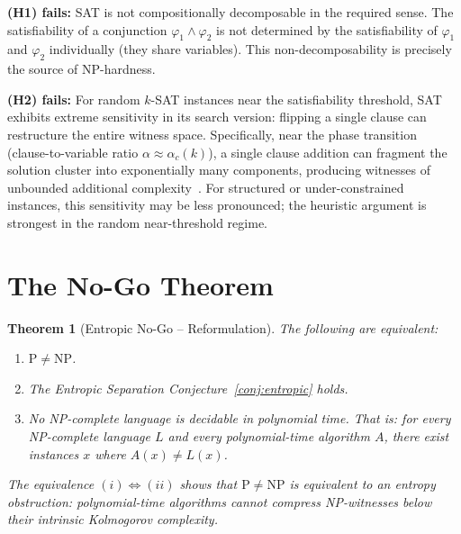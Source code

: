 \documentclass[aps,prd,twocolumn,superscriptaddress,nofootinbib]{revtex4-2}
\newtheorem{theorem}{Theorem}[section]
\theoremstyle{definition}
\theoremstyle{remark}
\newcommand{\NP}{\mathrm{NP}}
\newcommand{\PP}{\mathrm{P}}
\begin{document}
\textbf{(H1) fails:} SAT is not compositionally decomposable in the required sense. The satisfiability of a conjunction $\varphi_1 \wedge \varphi_2$ is not determined by the satisfiability of $\varphi_1$ and $\varphi_2$ individually (they share variables). This non-decomposability is precisely the source of NP-hardness.

\textbf{(H2) fails:} For random $k$-SAT instances near the satisfiability threshold, SAT exhibits extreme sensitivity in its search version: flipping a single clause can restructure the entire witness space. Specifically, near the phase transition (clause-to-variable ratio $\alpha \approx \alpha_c(k)$), a single clause addition can fragment the solution cluster into exponentially many components, producing witnesses of unbounded additional complexity~\cite{AchlioptasRicci2006,MezardZecchina2002}. For structured or under-constrained instances, this sensitivity may be less pronounced; the heuristic argument is strongest in the random near-threshold regime.


\section{The No-Go Theorem}
\label{sec:nogo}

\begin{theorem}[Entropic No-Go -- Reformulation]
\label{thm:nogo}
The following are equivalent:
\begin{enumerate}
\item[(i)] $\PP \neq \NP$.
\item[(ii)] The Entropic Separation Conjecture~\ref{conj:entropic} holds.
\item[(iii)] No NP-complete language is decidable in polynomial time. That is: for every NP-complete language $L$ and every polynomial-time algorithm $A$, there exist instances $x$ where $A(x) \neq L(x)$.
\end{enumerate}
The equivalence $(i) \Leftrightarrow (ii)$ shows that $\PP \neq \NP$ is \textit{equivalent} to an entropy obstruction: polynomial-time algorithms cannot compress NP-witnesses below their intrinsic Kolmogorov complexity.
\end{theorem}
\end{document}
